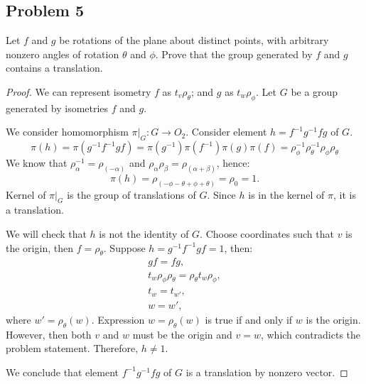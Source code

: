 \documentclass{article}
\theoremstyle{definition}
\newcommand{\restrict}[1]{ \big|_{#1} }
\begin{document}
\subsection*{Problem 5}

\begin{tcolorbox}
Let $f$ and $g$ be rotations of the plane about distinct points, with arbitrary nonzero angles of rotation $\theta$ and $\phi$.
Prove that the group generated by $f$ and $g$ contains a translation.
\end{tcolorbox}

\begin{proof}

We can represent isometry $f$ as $t_v \rho_\theta$; and $g$ as $t_w \rho_\phi$.
Let $G$ be a group generated by isometries $f$ and $g$.

We consider homomorphism $\pi \restrict{G} : G \to O_2$.
Consider element $h = f^{-1} g^{-1} f g$ of $G$.
\[
    \pi (h)
    = \pi (g^{-1} f^{-1} g f) 
    = \pi (g^{-1}) \pi (f^{-1}) \pi (g) \pi(f)
    = \rho_\phi^{-1} \rho_\theta^{-1} \rho_\phi \rho_\theta
\]
We know that $\rho_{\alpha}^{-1} = \rho_{(-\alpha)}$ and $\rho_\alpha \rho_\beta = \rho_{(\alpha + \beta)}$, hence:
\[ 
    \pi (h)
    = \rho_{(-\phi-\theta+\phi+\theta)} = \rho_0 = 1.
\]
Kernel of $\pi \restrict{G}$ is the group of translations of $G$.
Since $h$ is in the kernel of $\pi$, it is a translation.

We will check that $h$ is not the identity of $G$.
Choose coordinates such that $v$ is the origin, then $f = \rho_\theta$.
Suppose $h = g^{-1} f^{-1} g f = 1$, then:
\begin{gather*}
    gf = fg, \\
    t_w \rho_\phi \rho_\theta = \rho_\theta t_w \rho_\phi, \\
    t_w = t_{w'}, \\
    w = w',
\end{gather*}
where $w' = \rho_\theta(w)$.
Expression $w = \rho_\theta(w)$ is true if and only if $w$ is the origin.
However, then both $v$ and $w$ must be the origin and $v=w$, which contradicts the problem statement.
Therefore, $h \neq 1$.

We conclude that element $f^{-1} g^{-1} f g$ of $G$ is a translation by nonzero vector.

\end{proof}
\end{document}
